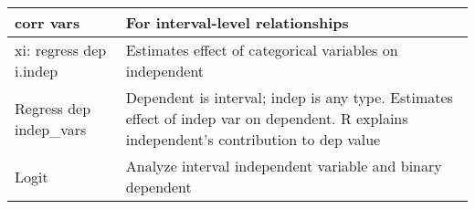 \documentclass{article}
\begin{document}
\begin{tabularx}{\linewidth}{ X X }
corr vars & For interval-level relationships \\\hline 
xi: regress dep i.indep & Estimates effect of categorical variables on independent \\\hline Regress dep indep\_vars & Dependent is interval; indep is any type.  Estimates effect of indep var on dependent.  R explains independent’s contribution to dep value \\\hline 
Logit & Analyze interval independent variable and binary dependent \\\hline 

\end{tabularx}
\end{document}
